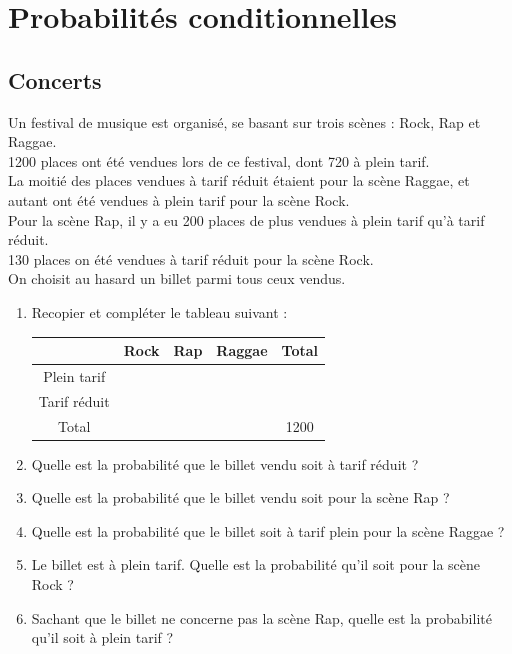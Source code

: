 \documentclass[oneside,12pt]{article}          %
\begin{document}
\section{Probabilités conditionnelles}


\subsection{Concerts}

Un festival de musique est organisé, se basant sur trois scènes : Rock, Rap et Raggae.\\
1200 places ont été vendues lors de ce festival, dont 720 à plein tarif.\\
La moitié des places vendues à tarif réduit étaient pour la scène Raggae, et autant ont été vendues à plein tarif pour la scène Rock.\\
Pour la scène Rap, il y a eu 200 places de plus vendues à plein tarif qu'à tarif réduit.\\
130 places on été vendues à tarif réduit pour la scène Rock.\\[5pt]
On choisit au hasard un billet parmi tous ceux vendus.

\begin{enumerate}
    \item Recopier et compléter le tableau suivant :
    \renewcommand{\arraystretch}{1.5}
        \begin{center}
        	\setlength{\tabcolsep}{16pt}
            \begin{tabular}{|c|c|c|c|c|}\hline
                & Rock & Rap & Raggae & Total\\ \hline
                Plein tarif & & & & \\ \hline
                Tarif réduit & & & & \\ \hline
                Total & & & & 1200 \\ \hline
            \end{tabular}    
        \end{center}    
    \item Quelle est la probabilité que le billet vendu soit à tarif réduit ?
    \item Quelle est la probabilité que le billet vendu soit pour la scène Rap ?
    \item Quelle est la probabilité que le billet soit à tarif plein pour la scène Raggae ?
    \item Le billet est à plein tarif. Quelle est la probabilité qu'il soit pour la scène Rock ?
    \item Sachant que le billet ne concerne pas la scène Rap, quelle est la probabilité qu'il soit à plein tarif ?
\end{enumerate}
\end{document}
